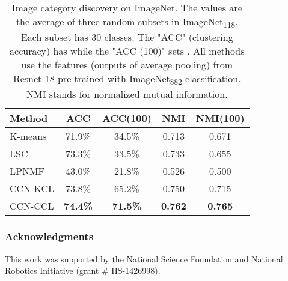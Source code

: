\documentclass[10pt,twocolumn,letterpaper]{article}
\begin{document}
\begin{table}
\centering
\caption{Image category discovery on ImageNet. The values are the average of three random subsets in ImageNet\textsubscript{118}. Each subset has 30 classes. The "ACC" (clustering accuracy) has  while the "ACC (100)" sets . All methods use the features (outputs of average pooling) from Resnet-18 pre-trained with ImageNet\textsubscript{882} classification. NMI stands for normalized mutual information.}
\label{tab:corsstask_imagenet}
\begin{tabular}{lcccc}
\toprule
Method & ACC             & ACC(100)        & NMI            & NMI(100)       \\ \midrule
K-means & 71.9\%          & 34.5\%          & 0.713          & 0.671          \\
LSC    & 73.3\%          & 33.5\%          & 0.733          & 0.655          \\
LPNMF  & 43.0\%          & 21.8\%          & 0.526          & 0.500          \\ 
CCN-KCL    & 73.8\% & 65.2\% & 0.750 & 0.715 \\ \midrule
CCN-CCL    & \textbf{74.4\%} & \textbf{71.5\%} & \textbf{0.762} & \textbf{0.765} \\
\bottomrule
\end{tabular}
\end{table}

\subsubsection*{Acknowledgments}
This work was supported by the National Science Foundation and National Robotics Initiative (grant \# IIS-1426998).
\end{document}
